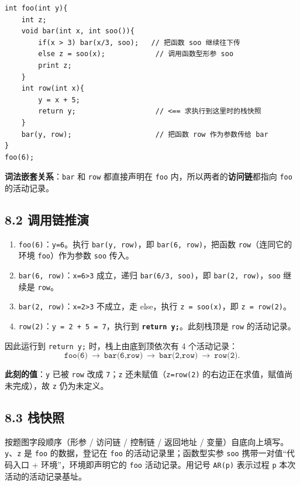 \documentclass[UTF8,zihao=-4]{ctexart}
\newcommand{\kw}[1]{\texttt{#1}}
\newcommand{\ans}[1]{\textbf{#1}}
\begin{document}
\begin{lstlisting}
int foo(int y){
    int z;
    void bar(int x, int soo()){
        if(x > 3) bar(x/3, soo);   // 把函数 soo 继续往下传
        else z = soo(x);            // 调用函数型形参 soo
        print z;
    }
    int row(int x){
        y = x + 5;
        return y;                   // <== 求执行到这里时的栈快照
    }
    bar(y, row);                    // 把函数 row 作为参数传给 bar
}
foo(6);
\end{lstlisting}

\textbf{词法嵌套关系}：\kw{bar} 和 \kw{row} 都直接声明在 \kw{foo} 内，所以两者的\textbf{访问链}都指向 \kw{foo} 的活动记录。

\subsection*{8.2 调用链推演}

\begin{enumerate}[label=(\arabic*)]
  \item \kw{foo(6)}：\kw{y=6}。执行 \kw{bar(y, row)}，即 \kw{bar(6, row)}，把函数 \kw{row}（连同它的环境 \kw{foo}）作为参数 \kw{soo} 传入。
  \item \kw{bar(6, row)}：\kw{x=6>3} 成立，递归 \kw{bar(6/3, soo)}，即 \kw{bar(2, row)}，\kw{soo} 继续是 \kw{row}。
  \item \kw{bar(2, row)}：\kw{x=2>3} 不成立，走 else，执行 \kw{z = soo(x)}，即 \kw{z = row(2)}。
  \item \kw{row(2)}：\kw{y = 2 + 5 = 7}，执行到 \ans{\kw{return y;}}。此刻栈顶是 \kw{row} 的活动记录。
\end{enumerate}

因此运行到 \kw{return y;} 时，栈上由底到顶依次有 4 个活动记录：
\[
\kw{foo(6)}\ \to\ \kw{bar(6,row)}\ \to\ \kw{bar(2,row)}\ \to\ \kw{row(2)}.
\]

\textbf{此刻的值}：\kw{y} 已被 \kw{row} 改成 \kw{7}；\kw{z} 还未赋值（\kw{z=row(2)} 的右边正在求值，赋值尚未完成），故 \kw{z} 仍为未定义。

\subsection*{8.3 栈快照}

按题图字段顺序（形参 / 访问链 / 控制链 / 返回地址 / 变量）自底向上填写。\kw{y}、\kw{z} 是 \kw{foo} 的数据，登记在 \kw{foo} 的活动记录里；函数型实参 \kw{soo} 携带一对值“代码入口 + 环境”，环境即声明它的 \kw{foo} 活动记录。用记号 \kw{AR(p)} 表示过程 \kw{p} 本次活动的活动记录基址。
\end{document}
